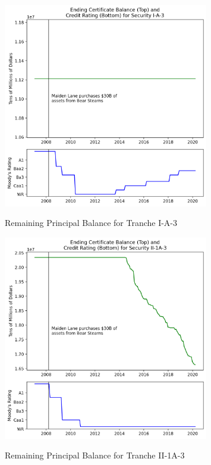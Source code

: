 \documentclass[12pt]{article}
\begin{document}
\begin{figure}[h]
	\centering
	\caption{Remaining Principal Balance for Tranche I-A-3}
	\includegraphics[width=0.8\textwidth]{../figures/timeseries_maiden_lane_ia3}
	\label{fig:timeseries_maiden_lane_ia3}
\end{figure}

\begin{figure}[h]
	\centering
	\caption{Remaining Principal Balance for Tranche II-1A-3}
	\includegraphics[width=0.8\textwidth]{../figures/timeseries_maiden_lane_ii1a3}
	\label{fig:timeseries_maiden_lane_ii1a3}
\end{figure}
\end{document}
